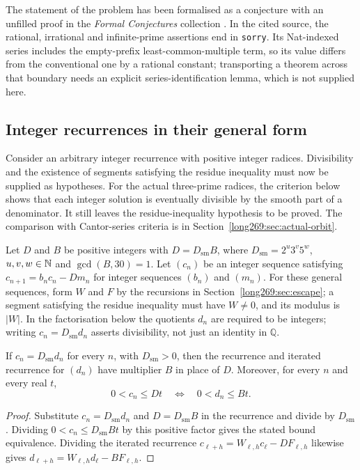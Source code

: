 \documentclass[11pt]{article}
\theoremstyle{remark}
\theoremstyle{plain}
\begin{document}
The statement of the problem has been formalised as a conjecture with an
unfilled proof in the \emph{Formal Conjectures} collection
\cite{formalconjectures269}.  In the cited source, the rational,
irrational and infinite-prime assertions end in \texttt{sorry}.  Its Nat-indexed series includes the empty-prefix
least-common-multiple term, so its value differs from the conventional one by a
rational constant; transporting a theorem across that boundary needs an
explicit series-identification lemma, which is not supplied here.

\subsection{Integer recurrences in their general form}
\label{long269:long:general-carries}

Consider an arbitrary integer recurrence with positive integer radices.
Divisibility and the existence of segments satisfying the residue inequality must now be supplied
as hypotheses. For the actual three-prime radices, the criterion below
shows that each integer solution is eventually divisible by the smooth part of a
denominator. It still leaves the residue-inequality hypothesis to be proved.
The comparison with Cantor-series criteria is in
Section~\ref{long269:sec:actual-orbit}.

Let $D$ and $B$ be positive integers with $D=D_{\mathrm{sm}}B$, where
$D_{\mathrm{sm}}=2^u3^v5^w$, $u,v,w\in\mathbb{N}$ and $\gcd(B,30)=1$.
Let $(c_n)$ be an integer sequence satisfying $c_{n+1}=b_nc_n-Dm_n$
for integer sequences $(b_n)$ and $(m_n)$.  For these general sequences,
form $W$ and $F$ by the recursions in Section~\ref{long269:sec:escape};
a segment satisfying the residue inequality must have $W\ne0$, and its modulus is $|W|$.
In the factorisation below the quotients $d_n$ are required to be integers;
writing $c_n=D_{\mathrm{sm}}d_n$ asserts divisibility, not just an identity
in $\mathbb Q$.

\begin{proposition}
\label{long269:long:denominator-reduction}
If $c_n=D_{\mathrm{sm}}d_n$ for every $n$, with $D_{\mathrm{sm}}>0$, then the
recurrence and iterated recurrence for $(d_n)$ have multiplier $B$ in place
of $D$.  Moreover, for every $n$ and every real $t$,
\[
 0<c_n\le Dt\quad\Longleftrightarrow\quad0<d_n\le Bt.
\]
\end{proposition}

\begin{proof}
Substitute $c_n=D_{\mathrm{sm}}d_n$ and $D=D_{\mathrm{sm}}B$ in the
recurrence and divide by $D_{\mathrm{sm}}$.  Dividing
$0<c_n\le D_{\mathrm{sm}}Bt$ by this positive factor gives the stated
bound equivalence.  Dividing the iterated recurrence
$c_{\ell+h}=W_{\ell,h}c_\ell-DF_{\ell,h}$ likewise gives
$d_{\ell+h}=W_{\ell,h}d_\ell-BF_{\ell,h}$.
\end{proof}
\end{document}
